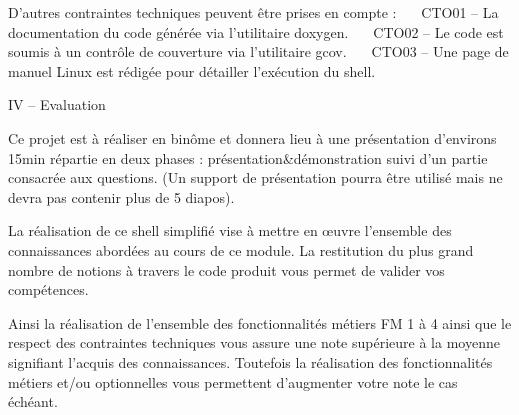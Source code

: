 D’autres contraintes techniques peuvent être prises en compte \+: ~\newline
  C\+T\+O01 – La documentation du code générée via l’utilitaire doxygen. ~\newline
  C\+T\+O02 – Le code est soumis à un contrôle de couverture via l’utilitaire gcov. ~\newline
  C\+T\+O03 – Une page de manuel Linux est rédigée pour détailler l’exécution du shell. ~\newline


IV – Evaluation

Ce projet est à réaliser en binôme et donnera lieu à une présentation d’environs 15min répartie en deux phases \+: présentation\&démonstration suivi d’un partie consacrée aux questions. (Un support de présentation pourra être utilisé mais ne devra pas contenir plus de 5 diapos).~\newline


La réalisation de ce shell simplifié vise à mettre en œuvre l’ensemble des connaissances abordées au cours de ce module. La restitution du plus grand nombre de notions à travers le code produit vous permet de valider vos compétences. ~\newline


Ainsi la réalisation de l’ensemble des fonctionnalités métiers FM 1 à 4 ainsi que le respect des contraintes techniques vous assure une note supérieure à la moyenne signifiant l’acquis des connaissances. Toutefois la réalisation des fonctionnalités métiers et/ou optionnelles vous permettent d’augmenter votre note le cas échéant.~\newline
 